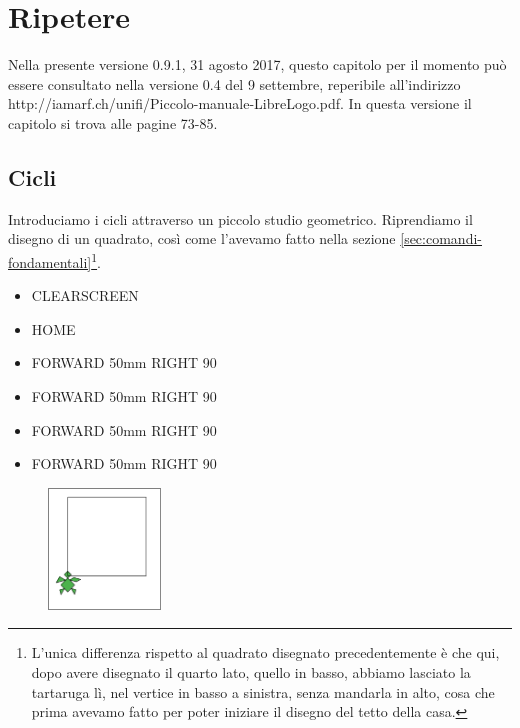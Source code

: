 \chapter{Ripetere} \label{cap:ripetere}

Nella presente versione 0.9.1, 31 agosto 2017, questo capitolo per il momento può essere consultato nella versione 0.4 del 9 settembre, reperibile all'indirizzo http://iamarf.ch/unifi/Piccolo-manuale-LibreLogo.pdf. In questa versione il capitolo si trova alle pagine 73-85.


\section{Cicli}

Introduciamo i cicli attraverso un piccolo studio geometrico. Riprendiamo il disegno di un quadrato, così come l'avevamo fatto nella sezione \ref{sec:comandi-fondamentali}\footnote{L'unica differenza rispetto al quadrato disegnato precedentemente è che qui, dopo avere disegnato il quarto lato, quello in basso, abbiamo lasciato la tartaruga lì, nel vertice in basso a sinistra, senza mandarla in alto, cosa che prima avevamo fatto per poter iniziare il disegno del tetto della casa.}.

\vskip 1cm

\begin{scriptsize}
\begin{minipage}{0.40\textwidth}
\begin{itemize}[itemsep=-3pt,parsep=2pt]
\item[] CLEARSCREEN          
\item[] HOME
\item[] FORWARD 50mm RIGHT 90
\item[] FORWARD 50mm RIGHT 90
\item[] FORWARD 50mm RIGHT 90
\item[] FORWARD 50mm RIGHT 90
\end{itemize}
\end{minipage}
\end{scriptsize}
\begin{minipage}{0.4\textwidth}
\begin{figure}[H]
   \includegraphics[width=3.0cm,trim=4 4 8 4,clip]{./images/ripetere/ripetere-1.png}
   \label{rip-1-a}
\end{figure}
\end{minipage} \hfill

